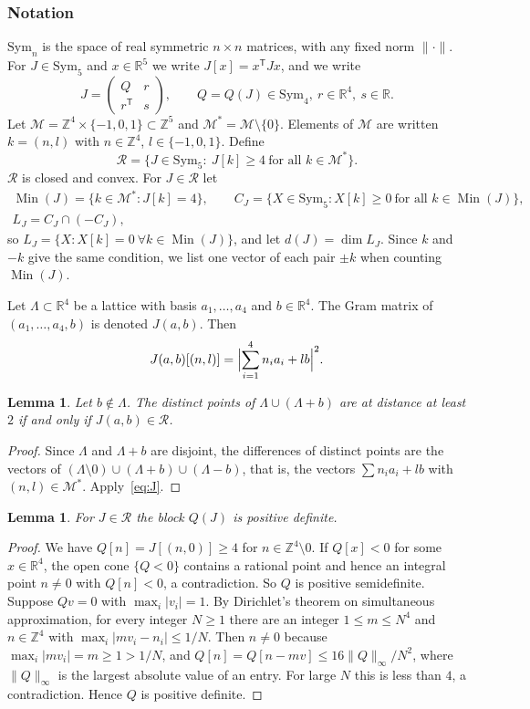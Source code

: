\documentclass[11pt,reqno]{amsart}
\renewcommand{\_}{\origunderscore\allowbreak}
\numberwithin{equation}{section}
\theoremstyle{plain}
\newtheorem{lem}[thm]{Lemma}
\theoremstyle{definition}
\theoremstyle{remark}
\newcommand{\R}{\mathbb{R}}
\newcommand{\Z}{\mathbb{Z}}
\newcommand{\M}{\mathcal{M}}
\newcommand{\Rk}{\mathcal{R}}
\newcommand{\Sym}{\mathrm{Sym}}
\newcommand{\Min}{\operatorname{Min}}
\begin{document}
\subsubsection{Notation}
$\Sym_n$ is the space of real symmetric $n\times n$ matrices, with any fixed norm $\|\cdot\|$. For $J\in\Sym_5$ and $x\in\R^5$ we write $J[x]=x^{\mathsf T}Jx$, and we write
\[
J=\begin{pmatrix}Q&r\\ r^{\mathsf T}&s\end{pmatrix},\qquad Q=Q(J)\in\Sym_4,\ r\in\R^4,\ s\in\R .
\]
Let $\M=\Z^4\times\{-1,0,1\}\subset\Z^5$ and $\M^*=\M\setminus\{0\}$. Elements of $\M$ are written $k=(n,l)$ with $n\in\Z^4$, $l\in\{-1,0,1\}$. Define
\[
\Rk=\{J\in\Sym_5:\ J[k]\ge4\ \text{for all }k\in\M^*\}.
\]
$\Rk$ is closed and convex. For $J\in\Rk$ let
\begin{gather*}
\Min(J)=\{k\in\M^*:J[k]=4\},\qquad C_J=\{X\in\Sym_5: X[k]\ge0\ \text{for all } k\in\Min(J)\},\\
L_J=C_J\cap(-C_J),
\end{gather*}
so $L_J=\{X:X[k]=0\ \forall k\in\Min(J)\}$, and let $d(J)=\dim L_J$. Since $k$ and $-k$ give the same condition, we list one vector of each pair $\pm k$ when counting $\Min(J)$.

Let $\Lambda\subset\R^4$ be a lattice with basis $a_1,\dots,a_4$ and $b\in\R^4$. The Gram matrix of $(a_1,\dots,a_4,b)$ is denoted $J(a,b)$. Then
\begin{equation}\label{eq:J}
J(a,b)[(n,l)]=\Bigl|\sum_{i=1}^4 n_ia_i+lb\Bigr|^2 .
\end{equation}

\begin{lem}\label{lem:packing}
Let $b\notin\Lambda$. The distinct points of $\Lambda\cup(\Lambda+b)$ are at distance at least $2$ if and only if $J(a,b)\in\Rk$.
\end{lem}

\begin{proof}
Since $\Lambda$ and $\Lambda+b$ are disjoint, the differences of distinct points are the vectors of $(\Lambda\setminus0)\cup(\Lambda+b)\cup(\Lambda-b)$, that is, the vectors $\sum n_ia_i+lb$ with $(n,l)\in\M^*$. Apply~\eqref{eq:J}.
\end{proof}

\begin{lem}\label{lem:pd}
For $J\in\Rk$ the block $Q(J)$ is positive definite.
\end{lem}

\begin{proof}
We have $Q[n]=J[(n,0)]\ge4$ for $n\in\Z^4\setminus0$. If $Q[x]<0$ for some $x\in\R^4$, the open cone $\{Q<0\}$ contains a rational point and hence an integral point $n\ne0$ with $Q[n]<0$, a contradiction. So $Q$ is positive semidefinite. Suppose $Qv=0$ with $\max_i|v_i|=1$. By Dirichlet's theorem on simultaneous approximation, for every integer $N\ge1$ there are an integer $1\le m\le N^4$ and $n\in\Z^4$ with $\max_i|mv_i-n_i|\le1/N$. Then $n\ne0$ because $\max_i|mv_i|=m\ge1>1/N$, and $Q[n]=Q[n-mv]\le16\|Q\|_{\infty}/N^2$, where $\|Q\|_\infty$ is the largest absolute value of an entry. For large $N$ this is less than $4$, a contradiction. Hence $Q$ is positive definite.
\end{proof}
\end{document}
